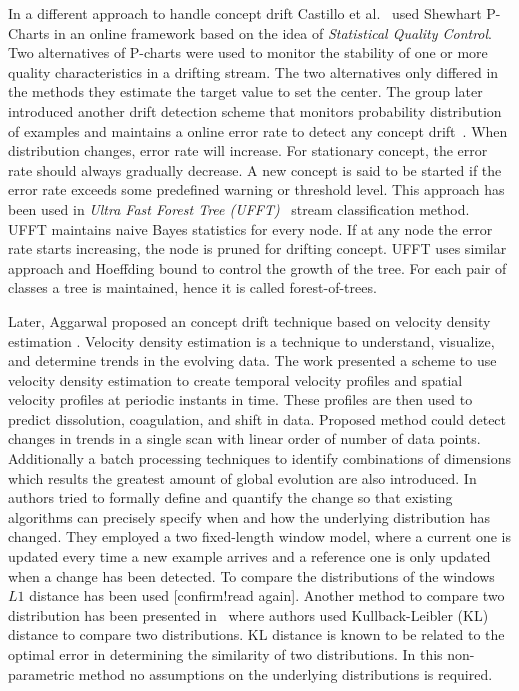 In a different approach to handle concept drift Castillo et al.~\cite{gama03:drift} used Shewhart P-Charts in an online framework based on the idea of \textit{Statistical Quality Control}. Two alternatives of P-charts were used to monitor the stability of one or more quality characteristics in a drifting stream. The two alternatives only differed in the methods they estimate the target value to set the center. The group later introduced another drift detection scheme that monitors probability distribution of examples and maintains a online error rate to detect any concept drift~\cite{gama04:drift}. When distribution changes, error rate will increase. For stationary concept, the error rate should always gradually decrease. A new concept is said to be started if the error rate exceeds some predefined warning or threshold level. This approach has been used in \textit{Ultra Fast Forest Tree (UFFT)}~\cite{gama04:ft, gama05:ft} stream classification method. UFFT maintains naive Bayes statistics for every node. If at any node the error rate starts increasing, the node is pruned for drifting concept. UFFT uses similar approach and Hoeffding bound to control the growth of the tree. For each pair of classes a tree is maintained, hence it is called forest-of-trees.

Later, Aggarwal proposed an concept drift technique based on velocity density estimation \cite{aggarwal03:condrift}. Velocity density estimation is a technique to understand, visualize, and determine trends in the evolving data. The work presented a scheme to use velocity density estimation to create temporal velocity profiles and spatial velocity profiles at periodic instants in time. These profiles are then used to predict dissolution, coagulation, and shift in data. Proposed method could detect changes in trends in a single scan with linear order of number of data points. Additionally a batch processing techniques to identify combinations of dimensions which results the greatest amount of global evolution are also introduced. In~\cite{kifer04:condrift} authors tried to formally define and quantify the change so that existing algorithms can precisely specify when and how the underlying distribution has changed. They employed a two fixed-length window model, where a current one is updated every time a new example arrives and a reference one is only updated when a change has been detected. To compare the distributions of the windows $L1$ distance has been used [confirm!read again]. Another method to compare two distribution has been presented in~\cite{dasu05:condrift} where authors used Kullback-Leibler (KL) distance to compare two distributions. KL distance is known to be related to the optimal error in determining the similarity of two distributions. In this non-parametric method no assumptions on the underlying distributions is required. 


